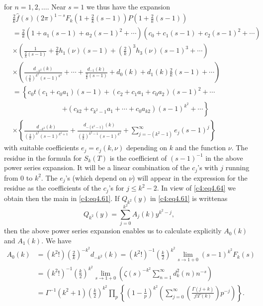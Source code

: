 for $n=1, 2, \ldots$. Near $s=1$ we thus have the expansion
{\fontsize{10pt}{12pt}\selectfont
\begin{align*}
  & \frac{2}{k} \hat{f} (s) (2 \pi)^{1-s} F_k \left(1+ \frac{2}{k} (s-1)
  \right) P\left(1+ \frac{2}{k} (s-1) \right)\\
  & =\frac{2}{k} \left(1+ a_1 (s-1) + a_2 (s-1)^2 + \cdots \right)
  \left(c_0 + c_1 (s-1) 
  + c_2 (s-1)^2 + \cdots\right)\\
  & \times \left(\frac{1}{\frac{2}{k} (s-1)} + \frac{2}{k} h_1 (\nu)
  (s-1) + \left(\frac{2}{k} \right)^3 h_3 (\nu) (s-1)^3+ \cdots
  \right)\\
  & \times \left( \frac{d_{-k^2}(k)}{\left(\frac{2}{k}\right)^{k^2}
    (s-1)^{k^2}} + \cdots + \frac{d_{-1} (k)}{\frac{2}{k} (s-1)} + d_0
  (k) + d_1 (k) \frac{2}{k} (s-1) + \cdots \right)\\
  &= \left\{ c_0 t (c_1 + c_0a_1) (s-1) + (c_2 + c_1a_1 + c_0 a_2)
  (s-1)^2 + \cdots\right. \\
  & \hspace{3cm}\left. + \left(c_{k2} + c_{k^2-1}a_1 + \cdots + c_0 a_{k2}\right)
  (s-1)^{k^2}+ \cdots \right\}\\
  & \times \left\{\frac{d_{-k^2}(k)}{\left(\frac{2}{k}\right)^{k^2}
    (s-1)^{k^2 +1}} + \frac{d_{- (k^2 -1)}(k)}{\left(\frac{2}{k}
    \right)^{k^2-1} (s-1)^{k^2}}+ \sum_{j= -(k^2 -1)}^\infty e_j (s-1)^j \right\}
\end{align*}}
with suitable coefficients $e_j = e_j (k, \nu)$ depending on $k$ and
the function $\nu$. The residue in the formula for $S_k (T)$ is the
coefficient of $(s-1)^{-1}$ in the above power series expansion. It
will be a linear combination of the $c_j$'s with $j$ running from 0 to
$k^2$. The $e_j$'s (which depend on $\nu$) will appear in the
expression for the residue as the coefficients of the $c_j$'s for $j
\leq k^2- 2$. In view of \eqref{c4:eq4.64} we obtain then the main in
\eqref{c4:eq4.61}. If $Q_{k^2}(y)$ in \eqref{c4:eq4.61} is
written\pageoriginale as 
$$
Q_{k^2} (y) = \sum_{j=0}^{k^2} A_j (k) y^{k^2-j},
$$
then the above power series expansion enables us to calculate
explicitly $A_0 (k)$ and $A_1 (k)$. We have
\begin{align*}
  A_0 (k) & = (k^2!) \left(\frac{2}{k}\right)^{-k^2} d_{-k^2} (k) =
  (k^2!)^{-1} \left(\frac{k}{2} \right)^{k^2} \lim\limits_{s \to 1+0} (s-1)^{k^2}
  F_k (s)\\
  & = (k^2!)^{-1} \left(\frac{k}{2} \right)^{k^2} \lim\limits_{s \to
    1+0} \left(\zeta(s)^{-k^2} \sum_{n=1}^\infty d_k^2 (n)
  n^{-s}\right)\\
  & = \Gamma^{-1} (k^2 +1) \left(\frac{k}{2} \right)^{k^2} \prod_p
  \left\{\left(1- \frac{1}{p}\right)^{k^2} \left(\sum_{j=0}^\infty
  \left(\frac{\Gamma (j+k)}{j! \Gamma(k)} \right) p^{-j} \right) \right\}.
\end{align*}


